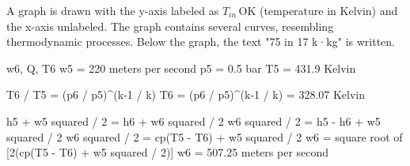 A graph is drawn with the y-axis labeled as \( T_{in} \, \text{OK} \) (temperature in Kelvin) and the x-axis unlabeled. The graph contains several curves, resembling thermodynamic processes. Below the graph, the text "75 in 17 k·kg" is written.

w6, Q, T6  
w5 = 220 meters per second  
p5 = 0.5 bar  
T5 = 431.9 Kelvin  

T6 / T5 = (p6 / p5)^(k-1 / k)  
T6 = (p6 / p5)^(k-1 / k) = 328.07 Kelvin  

h5 + w5 squared / 2 = h6 + w6 squared / 2  
w6 squared / 2 = h5 - h6 + w5 squared / 2  
w6 squared / 2 = cp(T5 - T6) + w5 squared / 2  
w6 = square root of [2(cp(T5 - T6) + w5 squared / 2)]  
w6 = 507.25 meters per second